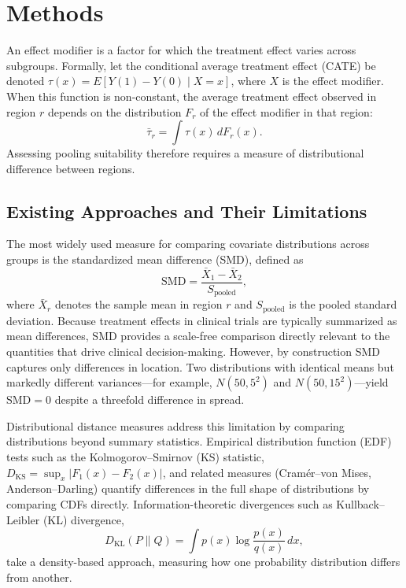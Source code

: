 
\section{Methods}\label{sec:methods}

An effect modifier is a factor for which the treatment effect varies across subgroups. Formally, let the conditional average treatment effect (CATE) be denoted $\tau(x) = E[Y(1) - Y(0) \mid X = x]$, where $X$ is the effect modifier. When this function is non-constant, the average treatment effect observed in region $r$ depends on the distribution $F_r$ of the effect modifier in that region:
\begin{equation}
\bar{\tau}_r = \int \tau(x) \, dF_r(x).
\label{eq:regional_ate}
\end{equation}
Assessing pooling suitability therefore requires a measure of distributional difference between regions.

\subsection{Existing Approaches and Their Limitations}\label{sec:existing}

The most widely used measure for comparing covariate distributions across groups is the standardized mean difference (SMD), defined as
\begin{equation}
\text{SMD} = \frac{\bar{X}_1 - \bar{X}_2}{S_{\text{pooled}}},
\label{eq:smd}
\end{equation}
where $\bar{X}_r$ denotes the sample mean in region $r$ and $S_{\text{pooled}}$ is the pooled standard deviation.\cite{austin2011} Because treatment effects in clinical trials are typically summarized as mean differences, SMD provides a scale-free comparison directly relevant to the quantities that drive clinical decision-making. However, by construction SMD captures only differences in location. Two distributions with identical means but markedly different variances---for example, $N(50, 5^2)$ and $N(50, 15^2)$---yield $\text{SMD} = 0$ despite a threefold difference in spread.

Distributional distance measures address this limitation by comparing distributions beyond summary statistics. Empirical distribution function (EDF) tests such as the Kolmogorov--Smirnov (KS) statistic, $D_{\text{KS}} = \sup_x |F_1(x) - F_2(x)|$, and related measures (Cram\'{e}r--von Mises, Anderson--Darling) quantify differences in the full shape of distributions by comparing CDFs directly. Information-theoretic divergences such as Kullback--Leibler (KL) divergence,
\begin{equation}
D_{\text{KL}}(P \| Q) = \int p(x) \log \frac{p(x)}{q(x)} \, dx,
\label{eq:kl}
\end{equation}
take a density-based approach, measuring how one probability distribution differs from another.

